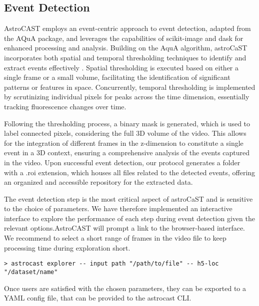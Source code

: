 \subsection{Event Detection}

AstroCAST employs an event-centric approach to event detection, adapted from the AQuA package\citep{wang_event-based_2018}, and leverages the capabilities of scikit-image and dask for enhanced processing and analysis\citep{van_der_walt_scikit-image_2014,dask_development_team_dask_2016}. Building on the AquA algorithm, astroCaST incorporates both spatial and temporal thresholding techniques to identify and extract events effectively . Spatial thresholding is executed based on either a single frame or a small volume, facilitating the identification of significant patterns or features in space. Concurrently, temporal thresholding is implemented by scrutinizing individual pixels for peaks across the time dimension, essentially tracking fluorescence changes over time.

Following the thresholding process, a binary mask is generated, which is used to label connected pixels, considering the full 3D volume of the video. This allows for the integration of different frames in the z-dimension to constitute a single event in a 3D context, ensuring a comprehensive analysis of the events captured in the video. Upon successful event detection, our protocol generates a folder with a .roi extension, which houses all files related to the detected events, offering an organized and accessible repository for the extracted data.

The event detection step is the most critical aspect of astroCaST and is sensitive to the choice of parameters. We have therefore implemented an interactive interface to explore the performance of each step during event detection given the relevant options.AstroCAST will prompt a link to the browser-based interface. We recommend to select a short range of frames in the video file to keep processing time during exploration short.

\begin{lstlisting}[style=bashStyle]
    > astrocast explorer -- input path "/path/to/file" -- h5-loc "/dataset/name"
\end{lstlisting}

Once users are satisfied with the chosen parameters, they can be exported to a YAML config file, that can be provided
to the astrocast \ac{CLI}.

